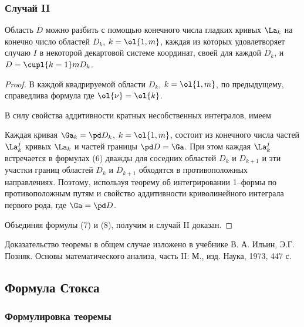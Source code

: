 \documentclass[a4paper]{article}
\begin{document}
\subsubsection{Случай II}

Область $D$ можно разбить с помощью конечного числа гладких кривых
$\La_k$ на конечно число областей $D_k$, $k=\ol{1,m}$, каждая из
которых удовлетворяет случаю $I$ в некоторой декартовой системе
координат, своей для каждой $D_k$, и $D=\cupl{k=1}m D_k$.

\begin{proof}
В каждой квадрируемой области $D_k$, $k=\ol{1,m}$, по предыдущему,
справедлива формула  где
$\ol{\nu}=\ol{k}$.

В силу свойства аддитивности кратных несобственных интегралов, имеем

Каждая кривая $\Ga_k=\pd D_k$, $k=\ol{1,m}$, состоит из конечного
числа частей $\La_k^j$ кривых $\La_k$ и частей границы $\pd D=\Ga$.
При этом каждая $\La_k^j$ встречается в формулах (6) дважды для
соседних областей $D_k$ и $D_{k+1}$ и эти участки границ областей
$D_k$ и $D_{k+1}$ обходятся в противоположных направлениях. Поэтому,
используя теорему об интегрировании 1--формы по противоположным
путям и свойство аддитивности криволинейного интеграла первого рода,
 где $\Ga=\pd D$.

Объединяя формулы (7) и (8), получим 
и случай II доказан.
\end{proof}

Доказательство теоремы в общем случае изложено в учебнике В. А.
Ильин, Э.Г. Позняк. Основы математического анализа, часть II: М.,
изд.  Наука, 1973, 447 с.

\subsection{Формула Стокса}
\subsubsection{Формулировка теоремы}
\end{document}
